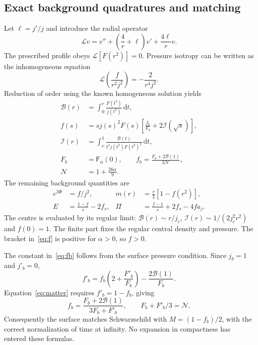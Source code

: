 \documentclass[aps,prd,reprint,a4paper,nofootinbib,floatfix]{revtex4-2}
\newcommand{\dd}{\mathrm d}
\begin{document}
\subsection{Exact background quadratures and matching}
Let $\ell=j'/j$ and introduce the radial operator
\begin{equation}
 \mathcal L v=v''+\left(\frac4r+\ell\right)v'+\frac{4\ell}{r}v.
\end{equation}
The prescribed profile obeys $\mathcal L[F(r^2)]=0$. Pressure isotropy can be written as the inhomogeneous equation
\begin{equation}
 \mathcal L\left(\frac{f}{r^2j^2}\right)=-\frac{2}{r^4j^2}.
 \label{eq:isotropy}
\end{equation}
Reduction of order using the known homogeneous solution yields
\begin{align}
 \mathcal B(r)&=\int_0^r\frac{F(t^2)}{j(t^2)}\,\dd t,\label{eq:B}\\
 f(s)&=s j(s)^2F(s)\left[\frac{f_b}{F_b}+2\mathcal I(\sqrt s)\right],\label{eq:f}\\
 \mathcal I(r)&=\int_r^1\frac{\mathcal B(t)}{t^4j(t^2)F(t^2)^2}\,\dd t,\label{eq:integral}\\
 F_b&=\mathsf F_\alpha(0),\qquad
 f_b=\frac{F_b+2\mathcal B(1)}{3\mathcal N},\label{eq:fb}\\
 \mathcal N&=1+\frac{26\alpha}{9}.\label{eq:norm}
\end{align}
The remaining background quantities are
\begin{align}
 e^{2\Phi}&=f/j^2, &m(r)&=\frac r2[1-f(r^2)],\label{eq:background}\\
 E&=\frac{1-f}{s}-2f_s,&
 \Pi&=\frac{f-1}{s}+2f_s-4fa_j.\label{eq:matter}
\end{align}
The centre is evaluated by its regular limit: $\mathcal B(r)\sim r/j_c$, $\mathcal I(r)\sim1/(2j_c^2r^2)$ and $f(0)=1$. The finite part fixes the regular central density and pressure. The bracket in~\eqref{eq:f} is positive for $\alpha>0$, so $f>0$.

The constant in~\eqref{eq:fb} follows from the surface pressure condition. Since $j_b=1$ and $j'_b=0$,
\begin{equation}
 f'_b=f_b\left(2+\frac{F'_b}{F_b}\right)-\frac{2\mathcal B(1)}{F_b}.
\end{equation}
Equation~\eqref{eq:matter} requires $f'_b=1-f_b$, giving
\begin{equation}
 f_b=\frac{F_b+2\mathcal B(1)}{3F_b+F'_b},
 \qquad F_b+F'_b/3=\mathcal N.
\end{equation}
Consequently the surface matches Schwarzschild with $M=(1-f_b)/2$, with the correct normalization of time at infinity. No expansion in compactness has entered these formulas.
\end{document}
